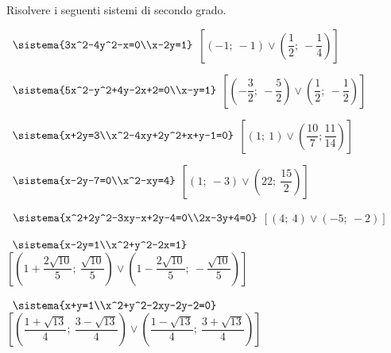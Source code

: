 \begin{esercizio}[*]
 \label{ese:6.7}
Risolvere i seguenti sistemi di secondo grado.
 \begin{enumeratea}
 \item~\(\sistema{3x^2-4y^2-x=0\\x-2y=1}\)
\hfill\(\left[\left(-1;~-1\right)\vee \left(\dfrac 1 2;~-\dfrac 1 
4\right)\right]\)
 
\item~\(\sistema{5x^2-y^2+4y-2x+2=0\\x-y=1}\)
\hfill\(\left[\left(-\dfrac 3 2;~-\dfrac 5 2\right) \vee 
       \left(\dfrac 1 2;~-\dfrac 1 2\right)\right]\)
 
\item~\(\sistema{x+2y=3\\x^2-4xy+2y^2+x+y-1=0}\)
\hfill\(\left[\left(1;~1\right)\vee \left(\dfrac{10} 7;
    \dfrac{11}{14}\right)\right]\)
 \item~\(\sistema{x-2y-7=0\\x^2-xy=4}\)
\hfill\(\left[\left(1;~-3\right)\vee \left(22;~\dfrac{15}{2}\right)\right]\)
\item~\(\sistema{x^2+2y^2-3xy-x+2y-4=0\\2x-3y+4=0}\)
\hfill\(\left[\left(4;~4\right)\vee \left(-5;~-2\right)\right]\)
 \item~\(\sistema{x-2y=1\\x^2+y^2-2x=1}\)
\hfill\(\left[\left(1+\dfrac{2\sqrt{10}} 5;~\dfrac{\sqrt{10}} 5\right)\vee 
\left(1-\dfrac{2\sqrt{10}} 5;~-\dfrac{\sqrt{10}} 5\right)\right]\)
 
\item~\(\sistema{x+y=1\\x^2+y^2-2xy-2y-2=0}\)
\hfill\(\left[\left(\dfrac{1+\sqrt{13}} 4;~\dfrac{3-\sqrt{13}} 4\right)\vee 
\left(\dfrac{1-\sqrt{13}} 4;~\dfrac{3+\sqrt{13}} 4\right)\right]\)
%  
 \end{enumeratea}
\end{esercizio}


